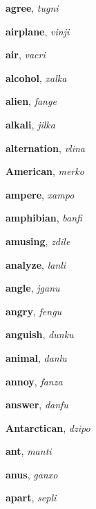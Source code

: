 \documentclass[12pt]{book}
\begin{document}
\begin{description}
\item[ ] \textbf{agree}, \textit{tugni}

\item[ ] \textbf{airplane}, \textit{vinji}

\item[ ] \textbf{air}, \textit{vacri}

\item[ ] \textbf{alcohol}, \textit{xalka}

\item[ ] \textbf{alien}, \textit{fange}

\item[ ] \textbf{alkali}, \textit{jilka}

\item[ ] \textbf{alternation}, \textit{vlina}

\item[ ] \textbf{American}, \textit{merko}

\item[ ] \textbf{ampere}, \textit{xampo}

\item[ ] \textbf{amphibian}, \textit{banfi}

\item[ ] \textbf{amusing}, \textit{zdile}

\item[ ] \textbf{analyze}, \textit{lanli}

\item[ ] \textbf{angle}, \textit{jganu}

\item[ ] \textbf{angry}, \textit{fengu}

\item[ ] \textbf{anguish}, \textit{dunku}

\item[ ] \textbf{animal}, \textit{danlu}

\item[ ] \textbf{annoy}, \textit{fanza}

\item[ ] \textbf{answer}, \textit{danfu}

\item[ ] \textbf{Antarctican}, \textit{dzipo}

\item[ ] \textbf{ant}, \textit{manti}

\item[ ] \textbf{anus}, \textit{ganxo}

\item[ ] \textbf{apart}, \textit{sepli}


\end{description}
\end{document}
